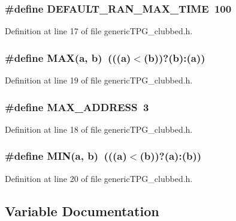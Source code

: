 \subsubsection[{DEFAULT\_\-RAN\_\-MAX\_\-TIME}]{\setlength{\rightskip}{0pt plus 5cm}\#define DEFAULT\_\-RAN\_\-MAX\_\-TIME~100}\label{genericTPG__clubbed_8h_95a6218d50e244f6e58b6cca098c1d65}




Definition at line 17 of file genericTPG\_\-clubbed.h.
\subsubsection[{MAX}]{\setlength{\rightskip}{0pt plus 5cm}\#define MAX(a, \/  b)~(((a)$<$(b))?(b):(a))}\label{genericTPG__clubbed_8h_fa99ec4acc4ecb2dc3c2d05da15d0e3f}




Definition at line 19 of file genericTPG\_\-clubbed.h.
\subsubsection[{MAX\_\-ADDRESS}]{\setlength{\rightskip}{0pt plus 5cm}\#define MAX\_\-ADDRESS~3}\label{genericTPG__clubbed_8h_aba07841c3e227bc8bdd8ccdad149349}




Definition at line 18 of file genericTPG\_\-clubbed.h.
\subsubsection[{MIN}]{\setlength{\rightskip}{0pt plus 5cm}\#define MIN(a, \/  b)~(((a)$<$(b))?(a):(b))}\label{genericTPG__clubbed_8h_3acffbd305ee72dcd4593c0d8af64a4f}




Definition at line 20 of file genericTPG\_\-clubbed.h.

\subsection{Variable Documentation}
